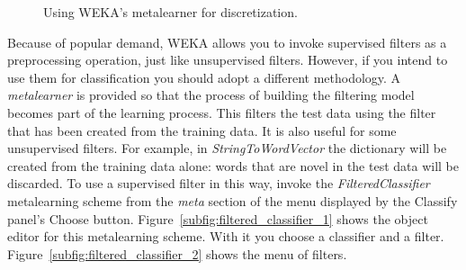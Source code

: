 \begin{figure}[!th]
\centering
{}
\qquad
{}
\caption{\label{fig:filtered_classifier}Using WEKA's metalearner for discretization.}
\end{figure}

Because of popular demand, WEKA allows you to invoke supervised
filters as a preprocessing operation, just like unsupervised
filters. However, if you intend to use them for classification you
should adopt a different methodology. A \textit{metalearner} is
provided so that the process of building the filtering model becomes
part of the learning process. This filters the test data using the
filter that has been created from the training data. It is also useful
for some unsupervised filters. For example, in
\textit{StringToWordVector} the dictionary will be created from the
training data alone: words that are novel in the test data will be
discarded. To use a supervised filter in this way, invoke the
\textit{FilteredClassifier} metalearning scheme from the
\textit{meta} section of the menu displayed by the Classify panel's
Choose button. Figure~\ref{subfig:filtered_classifier_1} shows the
object editor for this metalearning scheme. With it you choose a
classifier and a filter. Figure~\ref{subfig:filtered_classifier_2}
shows the menu of filters.

